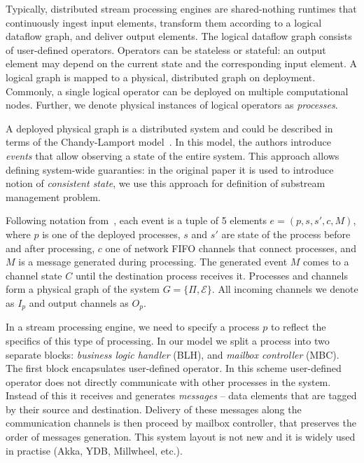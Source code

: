 Typically, distributed stream processing engines are shared-nothing runtimes that continuously ingest input elements, transform them according to a logical dataflow graph, and deliver output elements. The logical dataflow graph consists of user-defined operators. Operators can be stateless or stateful: an output element may depend on the current state and the corresponding input element. A logical graph is mapped to a physical, distributed graph on deployment. Commonly, a single logical operator can be deployed on multiple computational nodes. Further, we denote physical instances of logical operators as {\em processes}.

A deployed physical graph is a distributed system and could be described in terms of the Chandy-Lamport model~\cite{Chandy:1985:DSD:214451.214456, carbone2018scalable}. In this model, the authors introduce \textit{events} that allow observing a state of the entire system. This approach allows defining system-wide guaranties: in the original paper it is used to introduce notion of {\em consistent state}, we use this approach for definition of substream management problem.

Following notation from~\cite{Chandy:1985:DSD:214451.214456, carbone2018scalable}, each event is a tuple of 5 elements $e = (p, s, s', c, M)$, where $p$ is one of the deployed processes, $s$ and $s'$ are state of the process before and after processing, $c$ one of network FIFO channels that connect processes, and $M$ is a message generated during processing. The generated event $M$ comes to a channel state $C$ until the destination process receives it. Processes and channels form a physical graph of the system $G=\{\Pi,\mathcal{E}\}$. All incoming channels we denote as $I_p$ and output channels as $O_p$.

In a stream processing engine, we need to specify a process $p$ to reflect the specifics of this type of processing. In our model we split a process into two separate blocks: {\em business logic handler} (BLH), and {\em mailbox controller} (MBC). The first block encapsulates user-defined operator. In this scheme user-defined operator does not directly communicate with other processes in the system. Instead of this it receives and generates {\em messages} -- data elements that are tagged by their source and destination. Delivery of these messages along the communication channels is then proceed by mailbox controller, that preserves the order of messages generation. This system layout is not new and it is widely used in practise (Akka, YDB, Millwheel, etc.).

